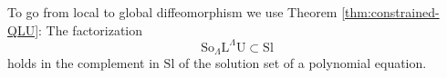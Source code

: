 \documentclass[reqno]{amsart}
\newcommand{\Sl}{\mathrm{Sl}}
\newcommand{\So}{\mathrm{So}}
\renewcommand{\L}{\mathrm{L}}
\newcommand{\U}{\mathrm{U}}
\theoremstyle{definition} %
\begin{document}
%
%
%
%


	
To go from local to global diffeomorphism we use  Theorem \ref{thm:constrained-QLU}: The factorization
\[\So_\Lambda \L^\Lambda  \U\subset \Sl\]
holds in the complement in $\Sl$ of the solution set of a polynomial equation.
%
%
\end{document}
